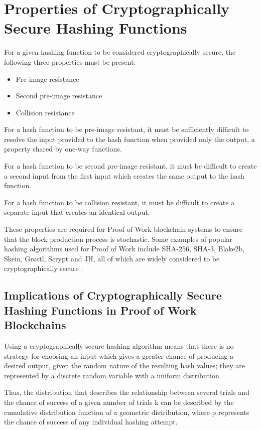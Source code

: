 \documentclass[]{article}
\begin{document}
\section{Properties of Cryptographically Secure Hashing Functions}
For a given hashing function to be considered cryptographically secure, the following three properties must be present: 
\begin{itemize}
	\item Pre-image resistance
	\item Second pre-image resistance
	\item Collision resistance
\end{itemize}

For a hash function to be pre-image resistant, it must be sufficiently difficult to resolve the input provided to the hash function when provided only the output, a property shared by one-way functions.   
\newline 

For a hash function to be second pre-image resistant, it must be difficult to create a second input from the first input which creates the same output to the hash function. 
\newline

For a hash function to be collision resistant, it must be difficult to create a separate input that creates an identical output. 
\newline

These properties are required for Proof of Work blockchain systems to ensure that the block production process is stochastic.  Some examples of popular hashing algorithms used for Proof of Work include SHA-256, SHA-3, Blake2b, Skein, Grøstl, Scrypt and JH, all of which are widely considered to be cryptographically secure \cite{CryptoAlgos}. 

\subsection{Implications of Cryptographically Secure Hashing Functions in Proof of Work Blockchains}
Using a cryptographically secure hashing algorithm means that there is no strategy for choosing an input which gives a greater chance of producing a desired output, given the random nature of the resulting hash values; they are represented by a discrete random variable with a uniform distribution.  
\newline

Thus, the distribution that describes the relationship between several trials and the chance of success of a given number of trials k can be described by the cumulative distribution function of a geometric distribution, where p represents the chance of success of any individual hashing attempt.   
\end{document}
